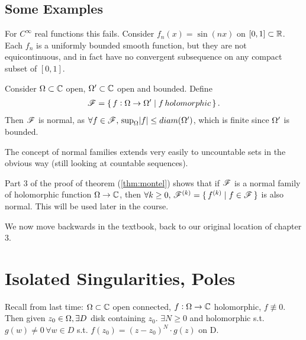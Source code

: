 \subsection{Some Examples}

\begin{example}
For $C^\infty$ real functions this fails. Consider $f_n(x) = \sin(nx)$ on $[0,1] \subset \mathbb{R}$. Each $f_n$ is a uniformly bounded smooth function, but they are not equicontinuous, and in fact have no convergent subsequence on any compact subset of $[0,1]$.


\end{example}


\begin{example}

Consider $\Omega \subset \mathbb{C}$ open, $\Omega ' \subset \mathbb{C}$ open and bounded. Define 
\begin{align*}
    \mathscr{F} = \set{ f: \Omega\to \Omega' \mid f \, holomorphic  }.
\end{align*} Then $\mathscr{F}$ is normal, as $\forall f \in \mathscr{F}, \, \sup_{\Omega} \abs{f} \leq diam(\Omega ')$, which is finite since $\Omega ' $ is bounded.

\end{example}


\begin{note}
The concept of normal families extends very easily to uncountable sets in the obvious way (still looking at countable sequences).
\end{note}

\begin{remark}
Part 3 of the proof of theorem (\ref{thm:montel}) shows that if $\mathscr{F}$ is a normal family of holomorphic function $\Omega \to \mathbb{C}$, then $\forall k\geq 0, \, \mathscr{F}^{(k)} = \set{f^{(k)} \mid f \in \mathscr{F}}$ is also normal. This will be used later in the course.
\end{remark}

We now move backwards in the textbook, back to our original location of chapter 3.


\section{Isolated Singularities, Poles}

Recall from last time: $\Omega \subset \mathbb{C} $ open connected, $f:\Omega \rightarrow \mathbb{C}$ holomorphic, $f \nequiv 0$. Then given $z_0 \in \Omega, \exists D $ disk containing $z_0$. $\exists N \geq 0$ and holomorphic s.t. $g(w) \neq 0 \, \forall w \in D$ s.t. $f(z_0) = (z-z_0)^N \cdot g(z) $ on D.


